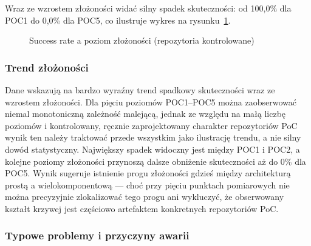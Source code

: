 Wraz ze wzrostem złożoności widać silny spadek skuteczności: od 100{,}0\% dla POC1 do 0{,}0\% dla POC5, co ilustruje wykres na rysunku~\ref{fig:h2-success-vs-complexity}.

\begin{figure}[h]
    \centering
    \caption{Success rate a poziom złożoności (repozytoria kontrolowane)}
    \label{fig:h2-success-vs-complexity}
\end{figure}

\subsubsection{Trend złożoności}

Dane wskazują na bardzo wyraźny trend spadkowy skuteczności wraz ze wzrostem złożoności. Dla pięciu poziomów POC1--POC5 można zaobserwować niemal monotoniczną zależność malejącą, jednak ze względu na małą liczbę poziomów i kontrolowany, ręcznie zaprojektowany charakter repozytoriów PoC wynik ten należy traktować przede wszystkim jako ilustrację trendu, a nie silny dowód statystyczny. Największy spadek widoczny jest między POC1 i POC2, a kolejne poziomy złożoności przynoszą dalsze obniżenie skuteczności aż do 0\% dla POC5. Wynik sugeruje istnienie progu złożoności gdzieś między architekturą prostą a wielokomponentową — choć przy pięciu punktach pomiarowych nie można precyzyjnie zlokalizować tego progu ani wykluczyć, że obserwowany kształt krzywej jest częściowo artefaktem konkretnych repozytoriów PoC.

\subsubsection{Typowe problemy i przyczyny awarii}

